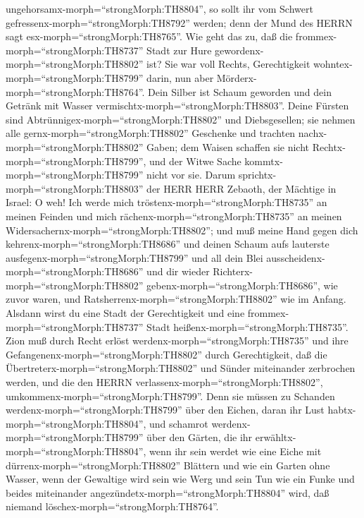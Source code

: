 ungehorsamx-morph=``strongMorph:TH8804'', so sollt ihr vom Schwert
gefressenx-morph=``strongMorph:TH8792'' werden; denn der Mund des HERRN
sagt esx-morph=``strongMorph:TH8765''.  Wie geht das zu,
daß die frommex-morph=``strongMorph:TH8737'' Stadt zur Hure
gewordenx-morph=``strongMorph:TH8802'' ist? Sie war voll Rechts,
Gerechtigkeit wohntex-morph=``strongMorph:TH8799'' darin, nun aber
Mörderx-morph=``strongMorph:TH8764''.  Dein Silber ist
Schaum geworden und dein Getränk mit Wasser
vermischtx-morph=``strongMorph:TH8803''.  Deine Fürsten
sind Abtrünnigex-morph=``strongMorph:TH8802'' und Diebsgesellen; sie
nehmen alle gernx-morph=``strongMorph:TH8802'' Geschenke und trachten
nachx-morph=``strongMorph:TH8802'' Gaben; dem Waisen schaffen sie nicht
Rechtx-morph=``strongMorph:TH8799'', und der Witwe Sache
kommtx-morph=``strongMorph:TH8799'' nicht vor sie.  Darum
sprichtx-morph=``strongMorph:TH8803'' der HERR HERR Zebaoth, der
Mächtige in Israel: O weh! Ich werde mich
tröstenx-morph=``strongMorph:TH8735'' an meinen Feinden und mich
rächenx-morph=``strongMorph:TH8735'' an meinen
Widersachernx-morph=``strongMorph:TH8802'';  und muß meine
Hand gegen dich kehrenx-morph=``strongMorph:TH8686'' und deinen Schaum
aufs lauterste ausfegenx-morph=``strongMorph:TH8799'' und all dein Blei
ausscheidenx-morph=``strongMorph:TH8686''  und dir wieder
Richterx-morph=``strongMorph:TH8802''
gebenx-morph=``strongMorph:TH8686'', wie zuvor waren, und
Ratsherrenx-morph=``strongMorph:TH8802'' wie im Anfang. Alsdann wirst du
eine Stadt der Gerechtigkeit und eine
frommex-morph=``strongMorph:TH8737'' Stadt
heißenx-morph=``strongMorph:TH8735''.  Zion muß durch Recht
erlöst werdenx-morph=``strongMorph:TH8735'' und ihre
Gefangenenx-morph=``strongMorph:TH8802'' durch Gerechtigkeit,
 daß die Übertreterx-morph=``strongMorph:TH8802'' und
Sünder miteinander zerbrochen werden, und die den HERRN
verlassenx-morph=``strongMorph:TH8802'',
umkommenx-morph=``strongMorph:TH8799''.  Denn sie müssen zu
Schanden werdenx-morph=``strongMorph:TH8799'' über den Eichen, daran ihr
Lust habtx-morph=``strongMorph:TH8804'', und schamrot
werdenx-morph=``strongMorph:TH8799'' über den Gärten, die ihr
erwähltx-morph=``strongMorph:TH8804'',  wenn ihr sein
werdet wie eine Eiche mit dürrenx-morph=``strongMorph:TH8802'' Blättern
und wie ein Garten ohne Wasser,  wenn der Gewaltige wird
sein wie Werg und sein Tun wie ein Funke und beides miteinander
angezündetx-morph=``strongMorph:TH8804'' wird, daß niemand
löschex-morph=``strongMorph:TH8764''.

